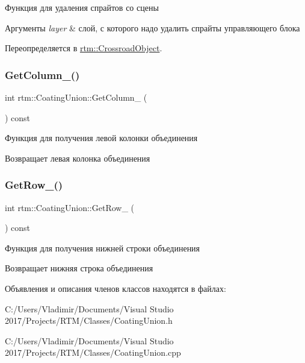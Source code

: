Функция для удаления спрайтов со сцены 
\begin{DoxyParams}{Аргументы}
{\em layer} & слой, с которого надо удалить спрайты управляющего блока \\
\hline
\end{DoxyParams}


Переопределяется в \hyperlink{classrtm_1_1_crossroad_object_a92e9357697edecc69564fd4d40524a3b}{rtm\+::\+Crossroad\+Object}.

\mbox{\label{classrtm_1_1_coating_union_a1d2b6a339f6cafbe41d416f371cbed04}} 
\subsubsection{\texorpdfstring{Get\+Column\+\_\+()}{GetColumn\_()}}
{\footnotesize\ttfamily int rtm\+::\+Coating\+Union\+::\+Get\+Column\+\_\+ (\begin{DoxyParamCaption}{ }\end{DoxyParamCaption}) const\hspace{0.3cm}{\ttfamily [protected]}}

Функция для получения левой колонки объединения \begin{DoxyReturn}{Возвращает}
левая колонка объединения 
\end{DoxyReturn}
\mbox{\label{classrtm_1_1_coating_union_ad283fd24e0c3347c569e3ea5772a9651}} 
\subsubsection{\texorpdfstring{Get\+Row\+\_\+()}{GetRow\_()}}
{\footnotesize\ttfamily int rtm\+::\+Coating\+Union\+::\+Get\+Row\+\_\+ (\begin{DoxyParamCaption}{ }\end{DoxyParamCaption}) const\hspace{0.3cm}{\ttfamily [protected]}}

Функция для получения нижней строки объединения \begin{DoxyReturn}{Возвращает}
нижняя строка объединения 
\end{DoxyReturn}


Объявления и описания членов классов находятся в файлах\+:\begin{DoxyCompactItemize}
\item 
C\+:/\+Users/\+Vladimir/\+Documents/\+Visual Studio 2017/\+Projects/\+R\+T\+M/\+Classes/Coating\+Union.\+h\item 
C\+:/\+Users/\+Vladimir/\+Documents/\+Visual Studio 2017/\+Projects/\+R\+T\+M/\+Classes/Coating\+Union.\+cpp\end{DoxyCompactItemize}
